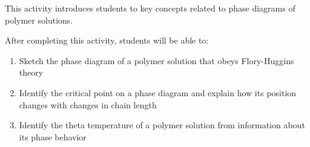 %
%
%
%

\renewcommand{\figpath}{content/polymphys/solution-thermo/phase-diagrams/figs}
\renewcommand{\labelbase}{phase-diagrams}

\begin{activity}

\begin{instructornotes}

	This activity introduces students to key concepts related to phase diagrams of polymer solutions.
	
	After completing this activity, students will be able to:
			\begin{enumerate}
				\item Sketch the phase diagram of a polymer solution that obeys Flory-Huggins theory
				\item Identify the critical point on a phase diagram and explain how its position changes with changes in chain length
				\item Identify the theta temperature of a polymer solution from information about its phase behavior
			\end{enumerate}
			

\end{instructornotes}
\end{activity}
